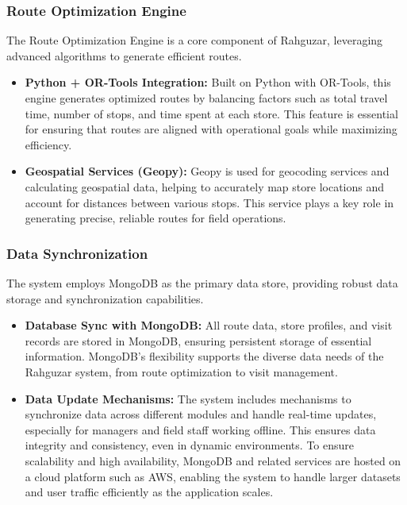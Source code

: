 \subsubsection{Route Optimization Engine}
The Route Optimization Engine is a core component of Rahguzar, leveraging advanced algorithms to generate efficient routes.
\begin{itemize}
    \item \textbf{Python + OR-Tools Integration:} Built on Python with OR-Tools, this engine generates optimized routes by balancing factors such as total travel time, number of stops, and time spent at each store. This feature is essential for ensuring that routes are aligned with operational goals while maximizing efficiency.
    \item \textbf{Geospatial Services (Geopy):} Geopy is used for geocoding services and calculating geospatial data, helping to accurately map store locations and account for distances between various stops. This service plays a key role in generating precise, reliable routes for field operations.
\end{itemize}

\subsubsection{Data Synchronization}
The system employs MongoDB as the primary data store, providing robust data storage and synchronization capabilities.
\begin{itemize}
    \item \textbf{Database Sync with MongoDB:} All route data, store profiles, and visit records are stored in MongoDB, ensuring persistent storage of essential information. MongoDB’s flexibility supports the diverse data needs of the Rahguzar system, from route optimization to visit management.
    \item \textbf{Data Update Mechanisms:} The system includes mechanisms to synchronize data across different modules and handle real-time updates, especially for managers and field staff working offline. This ensures data integrity and consistency, even in dynamic environments. To ensure scalability and high availability, MongoDB and related services are hosted on a cloud platform such as AWS, enabling the system to handle larger datasets and user traffic efficiently as the application scales.
\end{itemize}

